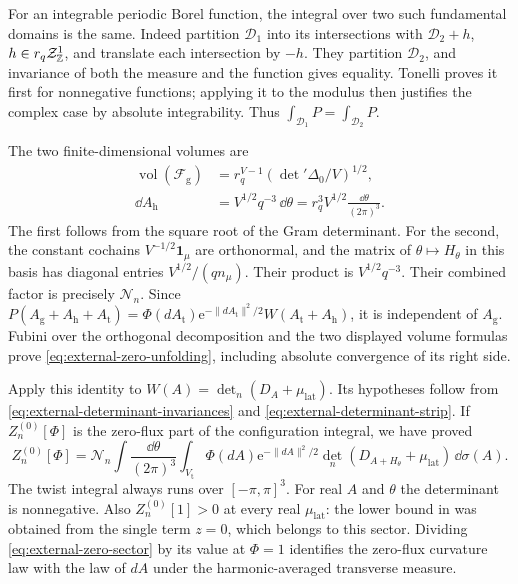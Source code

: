 For an integrable periodic Borel function, the integral
over two such fundamental domains is the same.
Indeed partition $\mathcal D_1$ into its intersections
with $\mathcal D_2+h$, $h\in r_q\mathcal Z^1_{\mathbb Z}$,
and translate each intersection by $-h$. They partition
$\mathcal D_2$, and invariance of both the measure and
the function gives equality. Tonelli proves it first
for nonnegative functions; applying it to the modulus
then justifies the complex case by absolute integrability.
Thus $\int_{\mathcal D_1}P=\int_{\mathcal D_2}P$.

The two finite-dimensional volumes are
\begin{align}
 \operatorname{vol}(\mathcal F_{\mathrm g})
    &=r_q^{V-1}(\det{}'\Delta_0/V)^{1/2},
                                     \label{eq:external-gauge-volume}\\
 \dd A_{\mathrm h}
    &=V^{1/2}q^{-3}\,\dd\theta
      =r_q^3V^{1/2}\frac{\dd\theta}{(2\pi)^3}.
                                     \label{eq:external-twist-Jacobian}
\end{align}
The first follows from the square root of the Gram
determinant. For the second, the constant cochains
$V^{-1/2}\mathbf1_\mu$ are orthonormal, and the
matrix of $\theta\mapsto H_\theta$ in this basis
has diagonal entries $V^{1/2}/(qn_\mu)$.
Their product is $V^{1/2}q^{-3}$.
Their combined factor is precisely $\mathcal N_n$.
Since $P(A_{\mathrm g}+A_{\mathrm h}+A_{\mathrm t})
=\Phi(dA_{\mathrm t})\mathrm e^{-\|dA_{\mathrm t}\|^2/2}
W(A_{\mathrm t}+A_{\mathrm h})$, it is independent
of $A_{\mathrm g}$. Fubini over the orthogonal
decomposition and the two displayed volume formulas
prove \eqref{eq:external-zero-unfolding}, including
absolute convergence of its right side.

Apply this identity to
$W(A)=\det_n(D_A+\mu_{\mathrm{lat}})$. Its hypotheses
follow from \eqref{eq:external-determinant-invariances}
and \eqref{eq:external-determinant-strip}. If
$Z_n^{(0)}[\Phi]$ is the zero-flux part of the
configuration integral, we have proved
\begin{equation}\label{eq:external-zero-sector}
 Z_n^{(0)}[\Phi]=\mathcal N_n
       \int\frac{\dd\theta}{(2\pi)^3}
       \int_{V_{\mathrm t}}\Phi(dA)\mathrm e^{-\|dA\|^2/2}
          \det_n(D_{A+H_\theta}+\mu_{\mathrm{lat}})\,\dd\sigma(A).
\end{equation}
The twist integral always runs over $[-\pi,\pi]^3$.
For real $A$ and $\theta$ the determinant is
nonnegative. Also $Z_n^{(0)}[1]>0$ at every real
$\mu_{\mathrm{lat}}$: the lower bound in
\cite[Proposition~2.3]{ChamberLattice} was obtained
from the single term $z=0$, which belongs to this
sector. Dividing \eqref{eq:external-zero-sector}
by its value at $\Phi=1$ identifies the zero-flux
curvature law with the law of $dA$ under the
harmonic-averaged transverse measure.

